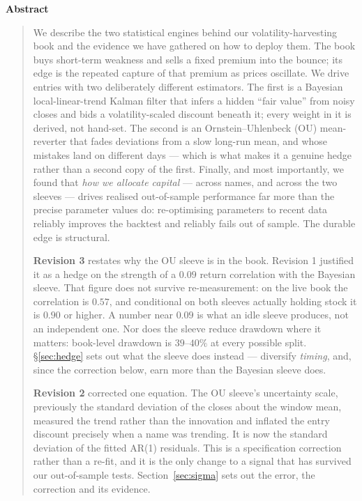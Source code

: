 \documentclass[11pt]{article}
\begin{document}
\begin{center}\textbf{Abstract}\end{center}
\begin{quote}\small
We describe the two statistical engines behind our volatility-harvesting book and the evidence we
have gathered on how to deploy them. The book buys short-term weakness and sells a fixed premium
into the bounce; its edge is the repeated capture of that premium as prices oscillate. We drive
entries with two deliberately different estimators. The first is a Bayesian local-linear-trend
Kalman filter that infers a hidden ``fair value'' from noisy closes and bids a volatility-scaled
discount beneath it; every weight in it is derived, not hand-set. The second is an
Ornstein--Uhlenbeck (OU) mean-reverter that fades deviations from a slow long-run mean, and whose
mistakes land on different days --- which is what makes it a genuine hedge rather than a second
copy of the first. Finally, and most importantly, we found that \emph{how we allocate capital}
--- across names, and across the two sleeves --- drives realised out-of-sample performance far
more than the precise parameter values do: re-optimising parameters to recent data reliably
improves the backtest and reliably fails out of sample. The durable edge is structural.

\textbf{Revision 3} restates why the OU sleeve is in the book. Revision 1 justified it as a
hedge on the strength of a $0.09$ return correlation with the Bayesian sleeve. That figure does
not survive re-measurement: on the live book the correlation is $0.57$, and conditional on both
sleeves actually holding stock it is $0.90$ or higher. A number near $0.09$ is what an idle
sleeve produces, not an independent one. Nor does the sleeve reduce drawdown where it matters:
book-level drawdown is $39$--$40\%$ at every possible split. \S\ref{sec:hedge} sets out what the
sleeve does instead --- diversify \emph{timing}, and, since the correction below, earn more than
the Bayesian sleeve does.

\textbf{Revision 2} corrected one equation. The OU sleeve's uncertainty scale, previously the
standard deviation of the closes about the window mean, measured the trend rather than the
innovation and inflated the entry discount precisely when a name was trending. It is now the
standard deviation of the fitted AR(1) residuals. This is a specification correction rather than
a re-fit, and it is the only change to a signal that has survived our out-of-sample tests.
Section~\ref{sec:sigma} sets out the error, the correction and its evidence.
\end{quote}
\end{document}
